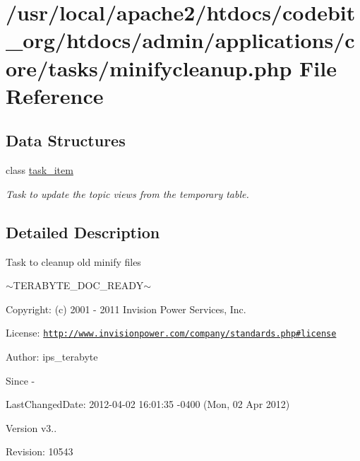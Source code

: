 \hypertarget{minifycleanup_8php}{\section{/usr/local/apache2/htdocs/codebit\-\_\-org/htdocs/admin/applications/core/tasks/minifycleanup.php File Reference}
\label{minifycleanup_8php}
}
\subsection*{Data Structures}
\begin{DoxyCompactItemize}
\item 
class \hyperlink{classtask__item}{task\-\_\-item}
\begin{DoxyCompactList}\small\item\em Task to update the topic views from the temporary table. \end{DoxyCompactList}\end{DoxyCompactItemize}


\subsection{Detailed Description}
\begin{DoxyVerb}  Task to cleanup old minify files
\end{DoxyVerb}
 $\sim$\-T\-E\-R\-A\-B\-Y\-T\-E\-\_\-\-D\-O\-C\-\_\-\-R\-E\-A\-D\-Y$\sim$ \begin{DoxyParagraph}{Copyright\-:}
(c) 2001 -\/ 2011 Invision Power Services, Inc.
\end{DoxyParagraph}
\begin{DoxyParagraph}{License\-:}
\href{http://www.invisionpower.com/company/standards.php#license}{\tt http\-://www.\-invisionpower.\-com/company/standards.\-php\#license}
\end{DoxyParagraph}
\begin{DoxyParagraph}{Author\-:}
ips\-\_\-terabyte 
\end{DoxyParagraph}
\begin{DoxySince}{Since}
-\/ 
\end{DoxySince}
\begin{DoxyParagraph}{Last\-Changed\-Date\-:}
2012-\/04-\/02 16\-:01\-:35 -\/0400 (Mon, 02 Apr 2012) 
\end{DoxyParagraph}
\begin{DoxyVersion}{Version}
v3.. 
\end{DoxyVersion}
\begin{DoxyParagraph}{Revision\-:}
10543 
\end{DoxyParagraph}
